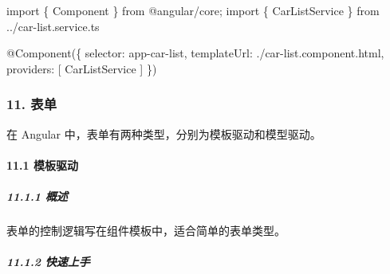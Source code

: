 \documentclass[
]{article}
\newenvironment{Shaded}{}{}
\newcommand{\DataTypeTok}[1]{\textcolor[rgb]{0.56,0.13,0.00}{#1}}
\newcommand{\FunctionTok}[1]{\textcolor[rgb]{0.02,0.16,0.49}{#1}}
\newcommand{\ImportTok}[1]{#1}
\newcommand{\NormalTok}[1]{#1}
\newcommand{\OperatorTok}[1]{\textcolor[rgb]{0.40,0.40,0.40}{#1}}
\newcommand{\StringTok}[1]{\textcolor[rgb]{0.25,0.44,0.63}{#1}}
\begin{document}
\begin{enumerate}
\begin{Shaded}
\begin{Highlighting}[]
\ImportTok{import}\NormalTok{ \{ Component \} }\ImportTok{from} \StringTok{\textquotesingle{}@angular/core\textquotesingle{}}\OperatorTok{;}
\ImportTok{import}\NormalTok{ \{ CarListService \} }\ImportTok{from} \StringTok{\textquotesingle{}../car{-}list.service.ts\textquotesingle{}}

\NormalTok{@}\FunctionTok{Component}\NormalTok{(\{}
  \DataTypeTok{selector}\OperatorTok{:}    \StringTok{\textquotesingle{}app{-}car{-}list\textquotesingle{}}\OperatorTok{,}
  \DataTypeTok{templateUrl}\OperatorTok{:} \StringTok{\textquotesingle{}./car{-}list.component.html\textquotesingle{}}\OperatorTok{,}
  \DataTypeTok{providers}\OperatorTok{:}\NormalTok{  [ CarListService ]}
\NormalTok{\})}
\end{Highlighting}
\end{Shaded}
\end{enumerate}

\hypertarget{11-ux8868ux5355}{%
\subsubsection{11. 表单}\label{11-ux8868ux5355}}

在 Angular 中，表单有两种类型，分别为模板驱动和模型驱动。

\hypertarget{111-ux6a21ux677fux9a71ux52a8}{%
\paragraph{11.1 模板驱动}\label{111-ux6a21ux677fux9a71ux52a8}}

\hypertarget{1111-ux6982ux8ff0}{%
\subparagraph{11.1.1 概述}\label{1111-ux6982ux8ff0}}

表单的控制逻辑写在组件模板中，适合简单的表单类型。

\hypertarget{1112-ux5febux901fux4e0aux624b}{%
\subparagraph{11.1.2 快速上手}\label{1112-ux5febux901fux4e0aux624b}}
\end{document}

